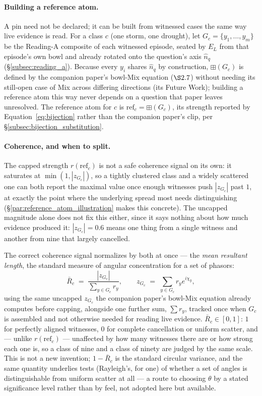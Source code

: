 \documentclass[12pt, a4paper]{article}
\begin{document}
\paragraph{Building a reference atom.}
\label{par:reference_atom}
A pin need not be declared; it can be built from witnessed cases the
same way live evidence is read. For a class $c$ (one storm, one
drought), let $G_c=\{y_1,\ldots,y_m\}$ be the Reading-A composite of
each witnessed episode, seated by $E_L$ from that episode's own bowl
and already rotated onto the question's axis $\hat n_q$
(\S\ref{subsec:reading_a}). Because every $y_i$ shares $\hat
n_q$ by construction, $\boxplus(G_c)$ is defined by the
companion paper's bowl-Mix equation ($\S2.7$) without needing its
still-open case of Mix across differing directions (its Future Work);
building a reference atom this way
never depends on a question that paper leaves unresolved. The
reference atom for $c$ is $\mathrm{ref}_c=\boxplus(G_c)$, its strength
reported by Equation~\eqref{eq:bijection} rather than the companion
paper's clip, per \S\ref{subsec:bijection_substitution}.

\paragraph{Coherence, and when to split.}
The capped strength $r(\mathrm{ref}_c)$ is not a safe coherence
signal on its own: it saturates at $\min(1,|z_{G_c}|)$, so a tightly
clustered class and a widely scattered one can both report the
maximal value once enough witnesses push $|z_{G_c}|$ past $1$, at
exactly the point where the underlying spread most needs
distinguishing (\S\ref{par:reference_atom_illustration} makes this
concrete). The uncapped magnitude alone does not fix this either,
since it says nothing about how much evidence produced it: $|z_{G_c}|
= 0.6$ means one thing from a single witness and another from nine
that largely cancelled.

The correct coherence signal normalizes by both at once --- the
\emph{mean resultant length}, the standard measure of angular
concentration for a set of phasors:
\begin{equation}
    \bar R_c \;=\; \frac{|z_{G_c}|}{\sum_{y\in G_c} r_y},
    \qquad
    z_{G_c} \;=\; \sum_{y\in G_c} r_y e^{i\chi_y},
    \label{eq:coherence}
\end{equation}
using the same uncapped $z_{G_c}$ the companion paper's bowl-Mix
equation already computes before capping, alongside one further sum,
$\sum r_y$, tracked once when $G_c$ is assembled and not otherwise
needed for reading live evidence. $\bar R_c\in[0,1]$: $1$ for
perfectly aligned witnesses, $0$ for complete cancellation or uniform
scatter, and --- unlike $r(\mathrm{ref}_c)$ --- unaffected by how many
witnesses there are or how strong each one is, so a class of nine and
a class of ninety are judged by the same scale. This is not a new
invention; $1-\bar R_c$ is the standard circular variance, and the
same quantity underlies tests (Rayleigh's, for one) of whether a set
of angles is distinguishable from uniform scatter at all --- a route
to choosing $\theta$ by a stated significance level rather than by
feel, not adopted here but available.
\end{document}
